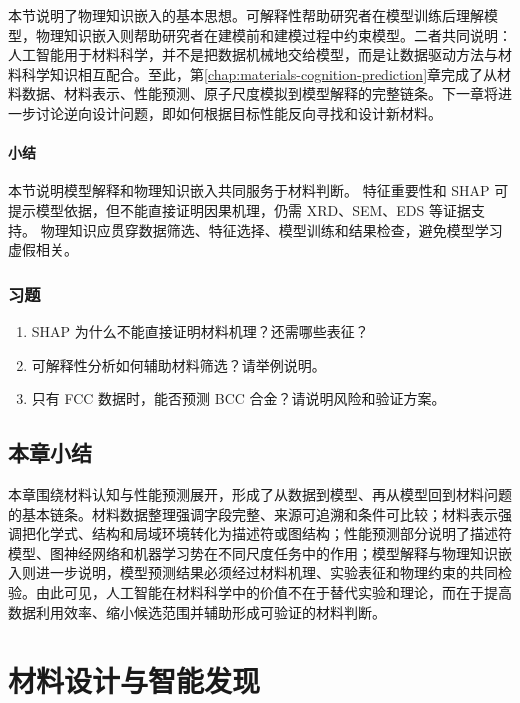 本节说明了物理知识嵌入的基本思想。可解释性帮助研究者在模型训练后理解模型，物理知识嵌入则帮助研究者在建模前和建模过程中约束模型。二者共同说明：人工智能用于材料科学，并不是把数据机械地交给模型，而是让数据驱动方法与材料科学知识相互配合。至此，第\ref{chap:materials-cognition-prediction}章完成了从材料数据、材料表示、性能预测、原子尺度模拟到模型解释的完整链条。下一章将进一步讨论逆向设计问题，即如何根据目标性能反向寻找和设计新材料。

\subsubsection*{\textbf{小结}}

本节说明模型解释和物理知识嵌入共同服务于材料判断。
特征重要性和 SHAP 可提示模型依据，但不能直接证明因果机理，仍需 XRD、SEM、EDS 等证据支持。
物理知识应贯穿数据筛选、特征选择、模型训练和结果检查，避免模型学习虚假相关。

\subsection*{习题}

\begin{enumerate}[leftmargin=*]
\item SHAP 为什么不能直接证明材料机理？还需哪些表征？
\item 可解释性分析如何辅助材料筛选？请举例说明。
\item 只有 FCC 数据时，能否预测 BCC 合金？请说明风险和验证方案。
\end{enumerate}

\section*{本章小结}

本章围绕材料认知与性能预测展开，形成了从数据到模型、再从模型回到材料问题的基本链条。材料数据整理强调字段完整、来源可追溯和条件可比较；材料表示强调把化学式、结构和局域环境转化为描述符或图结构；性能预测部分说明了描述符模型、图神经网络和机器学习势在不同尺度任务中的作用；模型解释与物理知识嵌入则进一步说明，模型预测结果必须经过材料机理、实验表征和物理约束的共同检验。由此可见，人工智能在材料科学中的价值不在于替代实验和理论，而在于提高数据利用效率、缩小候选范围并辅助形成可验证的材料判断。

\chapter{材料设计与智能发现}
\label{chap:materials-design-discovery}


